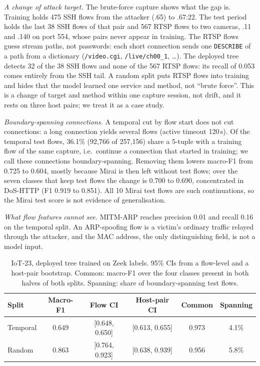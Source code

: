 \emph{A change of attack target.} The brute-force capture shows what the gap is. Training holds 475 SSH flows from the attacker (.65) to .67:22. The test period holds the last 38 SSH flows of that pair and 567 RTSP flows to two cameras, .11 and .140 on port 554, whose pairs never appear in training. The RTSP flows guess stream paths, not passwords: each short connection sends one \texttt{DESCRIBE} of a path from a dictionary (\texttt{/video.cgi}, \texttt{/live/ch00\_1}, \ldots). The deployed tree detects 32 of the 38 SSH flows and none of the 567 RTSP flows: its recall of 0.053 comes entirely from the SSH tail. A random split puts RTSP flows into training and hides that the model learned one service and method, not ``brute force''. This is a change of target and method within one capture session, not drift, and it rests on three host pairs; we treat it as a case study.

\emph{Boundary-spanning connections.} A temporal cut by flow start does not cut connections: a long connection yields several flows (active timeout 120\,s). Of the temporal test flows, 36.1\% (92,766 of 257,156) share a 5-tuple with a training flow of the same capture, i.e.\ continue a connection that started in training; we call these connections boundary-spanning. Removing them lowers macro-F1 from 0.725 to 0.604, mostly because Mirai is then left without test flows; over the seven classes that keep test flows the change is 0.700 to 0.690, concentrated in DoS-HTTP (F1 0.919 to 0.851). All 10 Mirai test flows are such continuations, so the Mirai test score is not evidence of generalisation.

\emph{What flow features cannot see.} MITM-ARP reaches precision 0.01 and recall 0.16 on the temporal split. An ARP-spoofing flow is a victim's ordinary traffic relayed through the attacker, and the MAC address, the only distinguishing field, is not a model input.

\begin{table}[t]
\centering
\caption{IoT-23, deployed tree trained on Zeek labels. 95\% CIs from a flow-level and a host-pair bootstrap. Common: macro-F1 over the four classes present in both halves of both splits. Spanning: share of boundary-spanning test flows.}
\label{tab:iot23split}
\footnotesize
\setlength{\tabcolsep}{2.5pt}
\begin{tabular}{lccccc}
\hline
Split & Macro-F1 & Flow CI & Host-pair CI & Common & Spanning \\
\hline
Temporal & 0.649 & [0.648, 0.650] & [0.613, 0.655] & 0.973 & 4.1\% \\
Random   & 0.863 & [0.764, 0.923] & [0.638, 0.939] & 0.956 & 5.8\% \\
\hline
\end{tabular}
\end{table}

